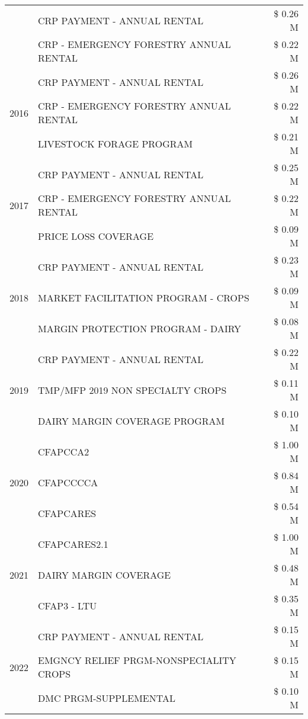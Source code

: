\begin{tabular}{llr}
 & CRP PAYMENT - ANNUAL RENTAL & \$ 0.26 M \\
 & CRP - EMERGENCY FORESTRY ANNUAL RENTAL & \$ 0.22 M \\
\cline{1-3}
\multirow[t]{3}{*}{2016} & CRP PAYMENT - ANNUAL RENTAL & \$ 0.26 M \\
 & CRP - EMERGENCY FORESTRY ANNUAL RENTAL & \$ 0.22 M \\
 & LIVESTOCK FORAGE PROGRAM & \$ 0.21 M \\
\cline{1-3}
\multirow[t]{3}{*}{2017} & CRP PAYMENT - ANNUAL RENTAL & \$ 0.25 M \\
 & CRP - EMERGENCY FORESTRY ANNUAL RENTAL & \$ 0.22 M \\
 & PRICE LOSS COVERAGE & \$ 0.09 M \\
\cline{1-3}
\multirow[t]{3}{*}{2018} & CRP PAYMENT - ANNUAL RENTAL & \$ 0.23 M \\
 & MARKET FACILITATION PROGRAM - CROPS & \$ 0.09 M \\
 & MARGIN PROTECTION PROGRAM - DAIRY & \$ 0.08 M \\
\cline{1-3}
\multirow[t]{3}{*}{2019} & CRP PAYMENT - ANNUAL RENTAL & \$ 0.22 M \\
 & TMP/MFP 2019 NON SPECIALTY CROPS & \$ 0.11 M \\
 & DAIRY MARGIN COVERAGE PROGRAM & \$ 0.10 M \\
\cline{1-3}
\multirow[t]{3}{*}{2020} & CFAPCCA2 & \$ 1.00 M \\
 & CFAPCCCCA & \$ 0.84 M \\
 & CFAPCARES & \$ 0.54 M \\
\cline{1-3}
\multirow[t]{3}{*}{2021} & CFAPCARES2.1 & \$ 1.00 M \\
 & DAIRY MARGIN COVERAGE & \$ 0.48 M \\
 & CFAP3 - LTU & \$ 0.35 M \\
\cline{1-3}
\multirow[t]{3}{*}{2022} & CRP PAYMENT - ANNUAL RENTAL & \$ 0.15 M \\
 & EMGNCY RELIEF PRGM-NONSPECIALITY CROPS & \$ 0.15 M \\
 & DMC PRGM-SUPPLEMENTAL & \$ 0.10 M \\
\cline{1-3}
\bottomrule
\end{tabular}
